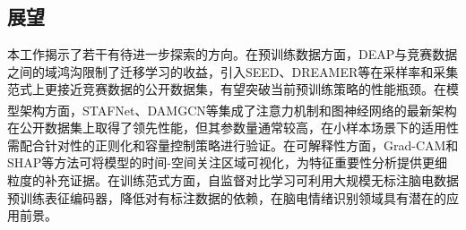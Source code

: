 \documentclass[UTF8,zihao=-4,fontset=windows]{ctexart}
\let\oldcite\cite
\renewcommand{\cite}[1]{\textsuperscript{\oldcite{#1}}}
\numberwithin{equation}{section}
\numberwithin{figure}{section}
\numberwithin{table}{section}
\begin{document}
\subsection{展望}

本工作揭示了若干有待进一步探索的方向。在预训练数据方面，DEAP与竞赛数据之间的域鸿沟限制了迁移学习的收益，引入SEED、DREAMER等在采样率和采集范式上更接近竞赛数据的公开数据集，有望突破当前预训练策略的性能瓶颈。在模型架构方面，STAFNet\cite{stafnet}、DAMGCN等集成了注意力机制和图神经网络的最新架构在公开数据集上取得了领先性能，但其参数量通常较高，在小样本场景下的适用性需配合针对性的正则化和容量控制策略进行验证。在可解释性方面，Grad-CAM和SHAP等方法可将模型的时间-空间关注区域可视化，为特征重要性分析提供更细粒度的补充证据。在训练范式方面，自监督对比学习可利用大规模无标注脑电数据预训练表征编码器，降低对有标注数据的依赖，在脑电情绪识别领域具有潜在的应用前景。
\end{document}
